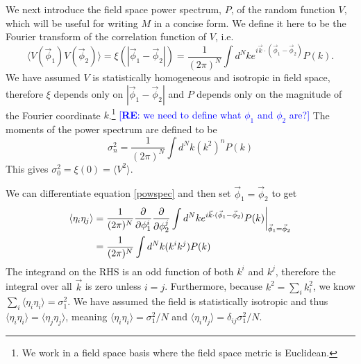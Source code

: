 \documentclass[12pt]{article}
\newcommand{\re}[1]{\textcolor{blue}{[{\bf RE}: #1]}}
\begin{document}
We next introduce the field space power spectrum, $P$, of the random function $V$, which will be useful for writing $M$ in a concise form. We define it here to be the Fourier transform of the correlation function of $V$, i.e.
%
\begin{equation}\label{powspec}
\langle V(\vec{\phi}_1) V(\vec{\phi}_2) \rangle = \xi(|\vec{\phi}_1-\vec{\phi}_2|)= \frac{1}{(2\pi)^N} \int d^Nk e^{i \vec{k} \cdot (\vec{\phi}_1-\vec{\phi}_2)} P(k).
\end{equation}
%
We have assumed $V$ is statistically homogeneous and isotropic in field space, therefore $\xi$ depends only on $|\vec{\phi}_1-\vec{\phi}_2|$ and  $P$ depends only on the magnitude of the Fourier coordinate $k$.\footnote{We work in a field space basis where the field space metric is Euclidean.} \re{we need to define what $\phi_1$ and $\phi_2$ are?} The moments of the power spectrum are defined to be
%
\begin{equation} \label{moments}
\sigma_n^2 = \frac{1}{(2\pi)^N}\int d^Nk (k^{2})^n P(k)
\end{equation}
%
This gives $\sigma_0^2=\xi(0)=\langle V^2 \rangle$.

We can differentiate equation \eqref{powspec} and then set $\vec{\phi}_1 = \vec{\phi}_2$ to get
%
\begin{align*}
\langle \eta_{i}\eta_{j}\rangle &= \frac{1}{(2\pi)^N} \frac{\partial}{\partial \phi_1^i}\frac{\partial}{\partial \phi_2^j} \int d^Nk e^{i \vec{k} \cdot (\vec{\phi}_1-\vec{\phi}_2)} P(k)\bigg{|}_{\vec{\phi}_1=\vec{\phi}_2}\\
&= \frac{1}{(2\pi)^N}\int d^Nk (k^i k^j) P(k)
\end{align*}
%
The integrand on the RHS is an odd function of both $k^i$ and $k^j$, therefore the integral over all $\vec{k}$ is zero unless $i=j$. Furthermore, because $k^2 = \sum_i k_i^2$, we know  $\sum_i \langle \eta_{i}\eta_{i}\rangle = \sigma_1^2$. We have assumed the field is statistically isotropic and thus $\langle \eta_{i}\eta_{i}\rangle=\langle \eta_{j}\eta_{j}\rangle$, meaning $\langle \eta_{i}\eta_{i}\rangle=\sigma_1^2/N$ and $\langle \eta_{i}\eta_{j}\rangle=\delta_{ij}\sigma_1^2/N$.

\end{document}
